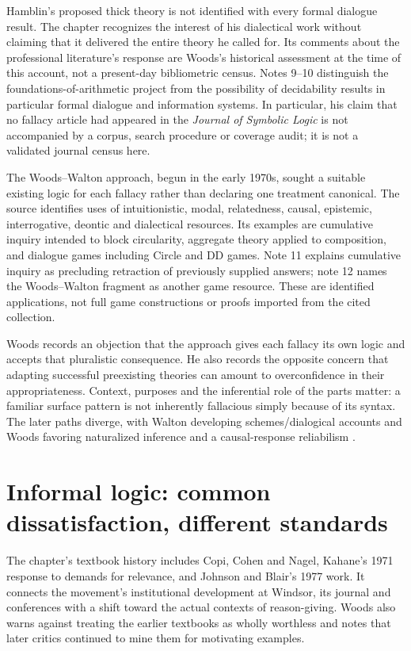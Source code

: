 Hamblin's proposed thick theory is not identified with every formal
dialogue result. The chapter recognizes the interest of his dialectical
work without claiming that it delivered the entire theory he called for.
Its comments about the professional literature's response are Woods's
historical assessment at the time of this account, not a present-day
bibliometric census. Notes 9--10 distinguish the foundations-of-arithmetic
project from the possibility of decidability results in particular
formal dialogue and information systems.
In particular, his claim that no fallacy article had appeared in the
\emph{Journal of Symbolic Logic} is not accompanied by a corpus,
search procedure or coverage audit; it is not a validated journal census here.

The Woods--Walton approach, begun in the early 1970s, sought a suitable
existing logic for each fallacy rather than declaring one treatment
canonical. The source identifies uses of intuitionistic, modal,
relatedness, causal, epistemic, interrogative, deontic and dialectical
resources. Its examples are cumulative inquiry intended to block
circularity, aggregate theory applied to composition, and dialogue
games including Circle and DD games. Note 11 explains cumulative inquiry
as precluding retraction of previously supplied answers; note 12 names
the Woods--Walton fragment as another game resource. These are identified
applications, not full game constructions or proofs imported from
the cited collection.

Woods records an objection that the approach gives each fallacy its own
logic and accepts that pluralistic consequence. He also records the
opposite concern that adapting successful preexisting theories can
amount to overconfidence in their appropriateness. Context, purposes
and the inferential role of the parts matter: a familiar surface pattern
is not inherently fallacious simply because of its syntax. The later
paths diverge, with Walton developing schemes/dialogical accounts and
Woods favoring naturalized inference and a causal-response reliabilism
\cite[pp.~370--371 and notes~11--16]{Woods2021ReasoningArgumentation}.

\section{Informal logic: common dissatisfaction, different standards}

The chapter's textbook history includes Copi, Cohen and Nagel, Kahane's
1971 response to demands for relevance, and Johnson and Blair's 1977
work. It connects the movement's institutional development at Windsor,
its journal and conferences with a shift toward the actual contexts of
reason-giving. Woods also warns against treating the earlier textbooks
as wholly worthless and notes that later critics continued to mine them
for motivating examples.

